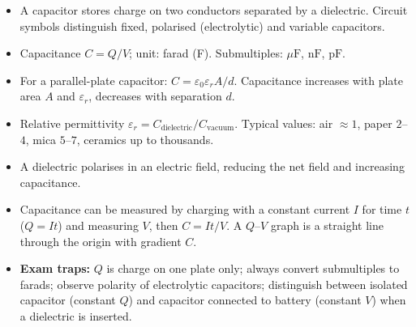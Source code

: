 \documentclass[11pt]{article}
\begin{document}
\begin{aretenir}
\begin{itemize}
    \item A capacitor stores charge on two conductors separated by a dielectric. Circuit symbols distinguish fixed, polarised (electrolytic) and variable capacitors.
    \item Capacitance $C = Q/V$; unit: farad (F). Submultiples: $\mu\mathrm{F}$, $\mathrm{nF}$, $\mathrm{pF}$.
    \item For a parallel-plate capacitor: $C = \varepsilon_0 \varepsilon_r A / d$. Capacitance increases with plate area $A$ and $\varepsilon_r$, decreases with separation $d$.
    \item Relative permittivity $\varepsilon_r = C_{\text{dielectric}} / C_{\text{vacuum}}$. Typical values: air $\approx 1$, paper $2$--$4$, mica $5$--$7$, ceramics up to thousands.
    \item A dielectric polarises in an electric field, reducing the net field and increasing capacitance.
    \item Capacitance can be measured by charging with a constant current $I$ for time $t$ ($Q = It$) and measuring $V$, then $C = It/V$. A $Q$--$V$ graph is a straight line through the origin with gradient $C$.
    \item \textbf{Exam traps:} $Q$ is charge on one plate only; always convert submultiples to farads; observe polarity of electrolytic capacitors; distinguish between isolated capacitor (constant $Q$) and capacitor connected to battery (constant $V$) when a dielectric is inserted.
\end{itemize}
\end{aretenir}
\end{document}
